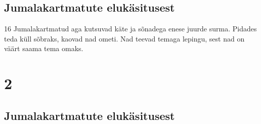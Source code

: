 \section*{Jumalakartmatute elukäsitusest}

\par 16 Jumalakartmatud aga kutsuvad käte ja sõnadega enese juurde surma. Pidades teda küll sõbraks, kaovad nad ometi. Nad teevad temaga lepingu, sest nad on väärt saama tema omaks. 

\chapter{2}

\section*{Jumalakartmatute elukäsitusest}

